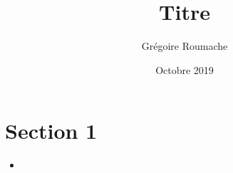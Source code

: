 \documentclass[a4paper]{article}
\title{Titre}
\author{Grégoire Roumache}
\date{Octobre 2019}
\begin{document}
\maketitle















\section{Section 1}





\begin{itemize}



\item 



\end{itemize}
\end{document}
